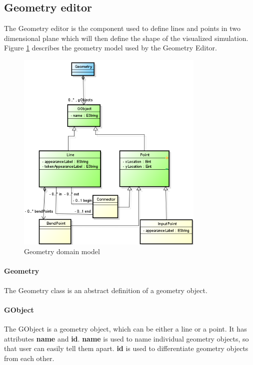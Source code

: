 \subsection{Geometry editor}

The Geometry editor is the component used to define lines and points in two dimensional plane which will then define the shape of the visualized simulation. Figure \ref{fig:model-geometry} describes the geometry model used by the Geometry Editor.

\begin{figure}[htp]
\begin{center}
  \includegraphics[width=0.8\textwidth]{image/geometry_diagram.png}
  \caption{Geometry domain model}
  \label{fig:model-geometry}
\end{center}
\end{figure}

\paragraph{Geometry}
The Geometry class is an abstract definition of a geometry object.

\paragraph{GObject}
The GObject is a geometry object, which can be either a line or a point. It has attributes \textbf{name} and \textbf{id}. \textbf{name} is used to name individual geometry objects, so that user can easily tell them apart. \textbf{id} is used to differentiate geometry objects from each other.

